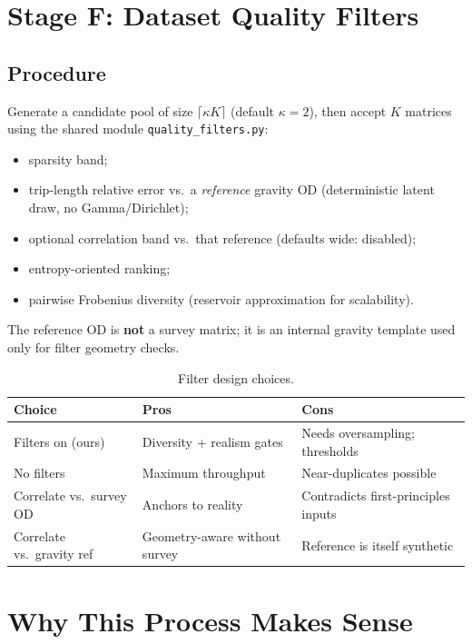 \documentclass[11pt,a4paper]{report}
\begin{document}
\chapter{Stage F: Dataset Quality Filters}
\label{ch:fp-filters}

\section{Procedure}

Generate a candidate pool of size $\lceil\kappa K\rceil$ (default $\kappa=2$), then accept $K$ matrices using the shared module \texttt{quality\_filters.py}:

\begin{itemize}[leftmargin=*]
    \item sparsity band;
    \item trip-length relative error vs.\ a \emph{reference} gravity OD (deterministic latent draw, no Gamma/Dirichlet);
    \item optional correlation band vs.\ that reference (defaults wide: disabled);
    \item entropy-oriented ranking;
    \item pairwise Frobenius diversity (reservoir approximation for scalability).
\end{itemize}

The reference OD is \textbf{not} a survey matrix; it is an internal gravity template used only for filter geometry checks.

\begin{table}[ht]
\centering
\caption{Filter design choices.}
\label{tab:fp-filt-pros}
\small
\begin{tabular}{@{}p{3.2cm}p{5.1cm}p{5.1cm}@{}}
\toprule
\textbf{Choice} & \textbf{Pros} & \textbf{Cons} \\
\midrule
Filters on (ours) &
Diversity + realism gates &
Needs oversampling; thresholds \\
No filters &
Maximum throughput &
Near-duplicates possible \\
Correlate vs.\ survey OD &
Anchors to reality &
Contradicts first-principles inputs \\
Correlate vs.\ gravity ref &
Geometry-aware without survey &
Reference is itself synthetic \\
\bottomrule
\end{tabular}
\end{table}


\chapter{Why This Process Makes Sense}
\label{ch:fp-why}
\end{document}
